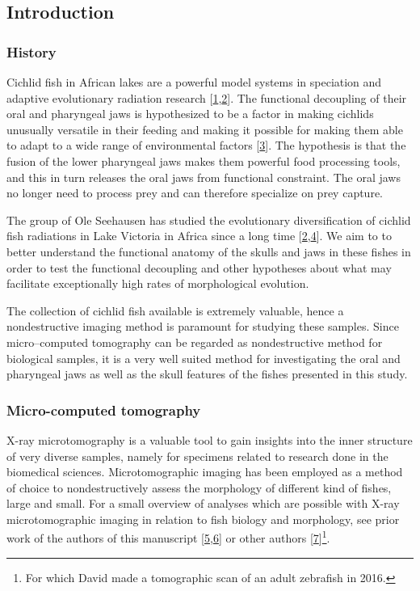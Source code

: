 \hypertarget{introduction}{%
\subsection{Introduction}\label{introduction}}

\hypertarget{history}{%
\subsubsection{History}\label{history}}

Cichlid fish in African lakes are a powerful model systems in speciation and adaptive evolutionary radiation research {[}\protect\hyperlink{ref-TUQFenhc}{1},\protect\hyperlink{ref-W2f2SDjn}{2}{]}.
The functional decoupling of their oral and pharyngeal jaws is hypothesized to be a factor in making cichlids unusually versatile in their feeding and making it possible for making them able to adapt to a wide range of environmental factors {[}\protect\hyperlink{ref-1GEljkDsf}{3}{]}.
The hypothesis is that the fusion of the lower pharyngeal jaws makes them powerful food processing tools, and this in turn releases the oral jaws from functional constraint.
The oral jaws no longer need to process prey and can therefore specialize on prey capture.

The group of Ole Seehausen has studied the evolutionary diversification of cichlid fish radiations in Lake Victoria in Africa since a long time {[}\protect\hyperlink{ref-W2f2SDjn}{2},\protect\hyperlink{ref-c3poTogo}{4}{]}.
We aim to to better understand the functional anatomy of the skulls and jaws in these fishes in order to test the functional decoupling and other hypotheses about what may facilitate exceptionally high rates of morphological evolution.

The collection of cichlid fish available is extremely valuable, hence a nondestructive imaging method is paramount for studying these samples.
Since micro--computed tomography can be regarded as nondestructive method for biological samples, it is a very well suited method for investigating the oral and pharyngeal jaws as well as the skull features of the fishes presented in this study.

\hypertarget{micro-computed-tomography}{%
\subsubsection{Micro-computed tomography}\label{micro-computed-tomography}}

X-ray microtomography is a valuable tool to gain insights into the inner structure of very diverse samples, namely for specimens related to research done in the biomedical sciences.
Microtomographic imaging has been employed as a method of choice to nondestructively assess the morphology of different kind of fishes, large and small.
For a small overview of analyses which are possible with X-ray microtomographic imaging in relation to fish biology and morphology, see prior work of the authors of this manuscript {[}\protect\hyperlink{ref-8Pmc2mI8}{5},\protect\hyperlink{ref-BDrCSu8p}{6}{]} or other authors {[}\protect\hyperlink{ref-3rxGCEvJ}{7}{]}\footnote{For which David made a tomographic scan of an adult zebrafish in 2016.}.

